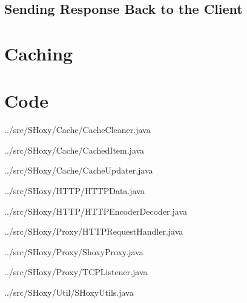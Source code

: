 \documentclass[11pt]{article}
\begin{document}
\subsection{Sending Response Back to the Client}

\section{Caching}
\section{Code}

\begin{tiny}

\begin{lstinputlisting}[language=Java]{../src/SHoxy/Cache/CacheCleaner.java}
\end{lstinputlisting}
\begin{lstinputlisting}[language=Java]{../src/SHoxy/Cache/CachedItem.java}
\end{lstinputlisting}
\begin{lstinputlisting}[language=Java]{../src/SHoxy/Cache/CacheUpdater.java}
\end{lstinputlisting}
\begin{lstinputlisting}[language=Java]{../src/SHoxy/HTTP/HTTPData.java}
\end{lstinputlisting}
\begin{lstinputlisting}[language=Java]{../src/SHoxy/HTTP/HTTPEncoderDecoder.java}
\end{lstinputlisting}
\begin{lstinputlisting}[language=Java]{../src/SHoxy/Proxy/HTTPRequestHandler.java}
\end{lstinputlisting}
\begin{lstinputlisting}[language=Java]{../src/SHoxy/Proxy/ShoxyProxy.java}
\end{lstinputlisting}
\begin{lstinputlisting}[language=Java]{../src/SHoxy/Proxy/TCPListener.java}
\end{lstinputlisting}
\begin{lstinputlisting}[language=Java]{../src/SHoxy/Util/SHoxyUtils.java}
\end{lstinputlisting}

\end{tiny}
\end{document}
